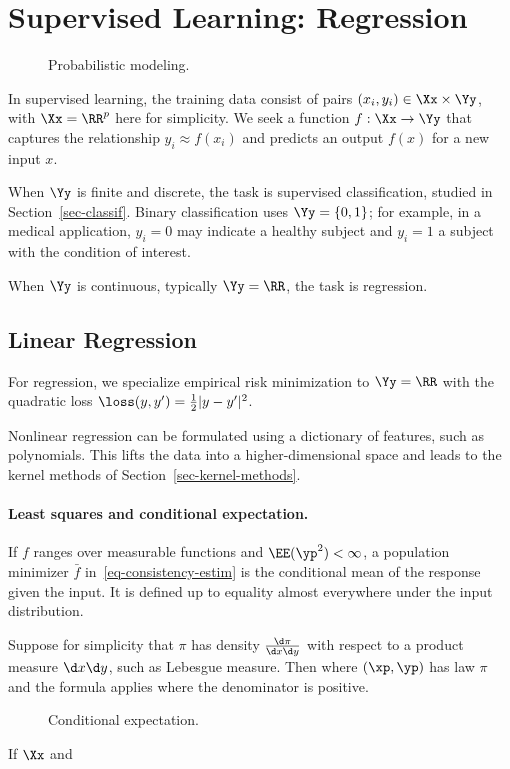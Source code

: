 \section{Supervised Learning: Regression}
\label{sec-regression}

\begin{figure}[tbp]
\centering
{}
\caption{Probabilistic modeling.}
\label{fig-review-ml-joint-model}
\end{figure}
In supervised learning, the training data consist of pairs $(x_i,y_i)\in\Xx\times\Yy$, with $\Xx=\RR^p$ here for simplicity. We seek a function $f:\Xx\rightarrow\Yy$ that captures the relationship $y_i\approx f(x_i)$ and predicts an output $f(x)$ for a new input $x$.

When $\Yy$ is finite and discrete, the task is supervised classification, studied in Section~\ref{sec-classif}. Binary classification uses $\Yy=\{0,1\}$; for example, in a medical application, $y_i=0$ may indicate a healthy subject and $y_i=1$ a subject with the condition of interest.
 
When $\Yy$ is continuous, typically $\Yy=\RR$, the task is regression.

                                                  
\subsection{Linear Regression}
\label{sec-linear-models}

For regression, we specialize empirical risk minimization to $\Yy=\RR$ with the quadratic loss $\loss(y,y')=\frac{1}{2}|y-y'|^2$.

Nonlinear regression can be formulated using a dictionary of features, such as polynomials. This lifts the data into a higher-dimensional space and leads to the kernel methods of Section~\ref{sec-kernel-methods}.

   
\paragraph{Least squares and conditional expectation.}

If $f$ ranges over measurable functions and $\EE(\yp^2)<\infty$, a population minimizer $\bar f$ in~\eqref{eq-consistency-estim} is the conditional mean of the response given the input. It is defined up to equality almost everywhere under the input distribution.
 
Suppose for simplicity that $\pi$ has density $\frac{\d \pi}{\d x \d y}$ with respect to a product measure $\d x \d y$, such as Lebesgue measure. Then
where $(\xp,\yp)$ has law $\pi$ and the formula applies where the denominator is positive.


\begin{figure}[tbp]
\centering
{}
\caption{Conditional expectation.}
\label{fig-bound-regul}
\end{figure}

If $\Xx$ and